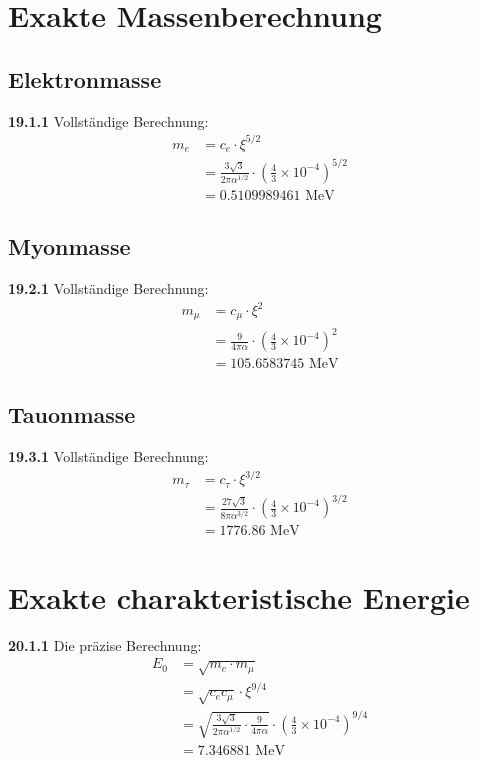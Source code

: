 \section{Exakte Massenberechnung}

\subsection{Elektronmasse}
\noindent \textbf{19.1.1} Vollständige Berechnung:
\begin{align}
	m_e &= c_e \cdot \xi^{5/2} \\
	&= \frac{3\sqrt{3}}{2\pi\alpha^{1/2}} \cdot \left(\frac{4}{3} \times 10^{-4}\right)^{5/2} \\
	&= 0.5109989461 \text{ MeV}
\end{align}

\subsection{Myonmasse}
\noindent \textbf{19.2.1} Vollständige Berechnung:
\begin{align}
	m_\mu &= c_\mu \cdot \xi^2 \\
	&= \frac{9}{4\pi\alpha} \cdot \left(\frac{4}{3} \times 10^{-4}\right)^2 \\
	&= 105.6583745 \text{ MeV}
\end{align}

\subsection{Tauonmasse}
\noindent \textbf{19.3.1} Vollständige Berechnung:
\begin{align}
	m_\tau &= c_\tau \cdot \xi^{3/2} \\
	&= \frac{27\sqrt{3}}{8\pi\alpha^{3/2}} \cdot \left(\frac{4}{3} \times 10^{-4}\right)^{3/2} \\
	&= 1776.86 \text{ MeV}
\end{align}

\section{Exakte charakteristische Energie}
\noindent \textbf{20.1.1} Die präzise Berechnung:
\begin{align}
	E_0 &= \sqrt{m_e \cdot m_\mu} \\
	&= \sqrt{c_e c_\mu} \cdot \xi^{9/4} \\
	&= \sqrt{\frac{3\sqrt{3}}{2\pi\alpha^{1/2}} \cdot \frac{9}{4\pi\alpha}} \cdot \left(\frac{4}{3} \times 10^{-4}\right)^{9/4} \\
	&= 7.346881 \text{ MeV}
\end{align}


